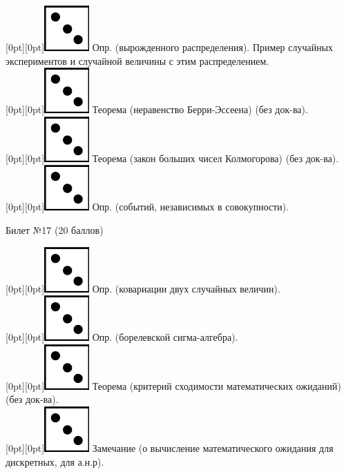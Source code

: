 \documentclass[10pt]{article}
\begin{document}
\raisebox{-1pt}[0pt][0pt]{\includegraphics[width=0.02\linewidth]{3.png}} Опр. (вырожденного распределения). Пример случайных экспериментов и случайной величины с этим распределением. \\

\raisebox{-1pt}[0pt][0pt]{\includegraphics[width=0.02\linewidth]{3.png}} Теорема (неравенство Берри-Эссеена) (без док-ва). \\

\raisebox{-1pt}[0pt][0pt]{\includegraphics[width=0.02\linewidth]{3.png}} Теорема (закон больших чисел Колмогорова) (без док-ва). \\

\raisebox{-1pt}[0pt][0pt]{\includegraphics[width=0.02\linewidth]{3.png}} Опр. (событий, независимых в совокупности). \\

\begin{center} {\Large Билет №17 (20 баллов)} \end{center}

\raisebox{-1pt}[0pt][0pt]{\includegraphics[width=0.02\linewidth]{3.png}} Опр. (ковариации двух случайных величин). \\

\raisebox{-1pt}[0pt][0pt]{\includegraphics[width=0.02\linewidth]{3.png}} Опр. (борелевской сигма-алгебра). \\

\raisebox{-1pt}[0pt][0pt]{\includegraphics[width=0.02\linewidth]{3.png}} Теорема (критерий сходимости математических ожиданий) (без док-ва). \\

\raisebox{-1pt}[0pt][0pt]{\includegraphics[width=0.02\linewidth]{3.png}} Замечание (о вычисление  математического ожидания для дискретных, для а.н.р). \\
\end{document}
